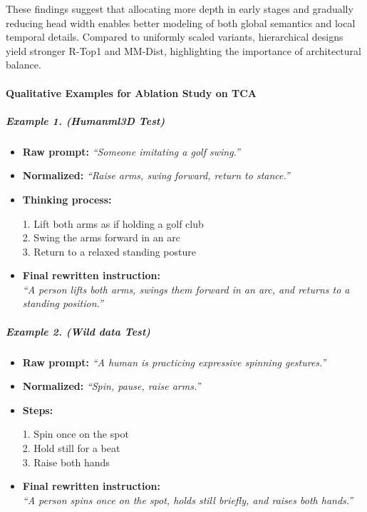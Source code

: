 \documentclass[a4paper,12pt]{article}
\begin{document}
These findings suggest that allocating more depth in early stages and gradually reducing head width enables better modeling of both global semantics and local temporal details. Compared to uniformly scaled variants, hierarchical designs yield stronger R-Top1 and MM-Dist, highlighting the importance of architectural balance.


\paragraph{Qualitative Examples for Ablation Study on TCA}
\subparagraph{Example 1. (Humanml3D Test)}
\begin{itemize}
  \item \textbf{Raw prompt:}  
        \emph{``Someone imitating a golf swing.''}
  \item \textbf{Normalized:}  
        \emph{``Raise arms, swing forward, return to stance.''}
  \item \textbf{Thinking process:}
  
         1. Lift both arms as if holding a golf club \\
         2. Swing the arms forward in an arc \\
         3. Return to a relaxed standing posture \\
  \item \textbf{Final rewritten instruction:}\\
        \emph{``A person lifts both arms, swings them forward in an arc, and returns to a standing position.''}
\end{itemize}

\subparagraph{Example 2. (Wild data Test)}
\begin{itemize}
  \item \textbf{Raw prompt:}  
        \emph{``A human is practicing expressive spinning gestures.''}
  \item \textbf{Normalized:}  
        \emph{``Spin, pause, raise arms.''}
  \item \textbf{Steps:}

1. Spin once on the spot \\
2. Hold still for a beat \\
3. Raise both hands \\

  \item \textbf{Final rewritten instruction:}\\
        \emph{``A person spins once on the spot, holds still briefly, and raises both hands.''}
\end{itemize}
\end{document}
